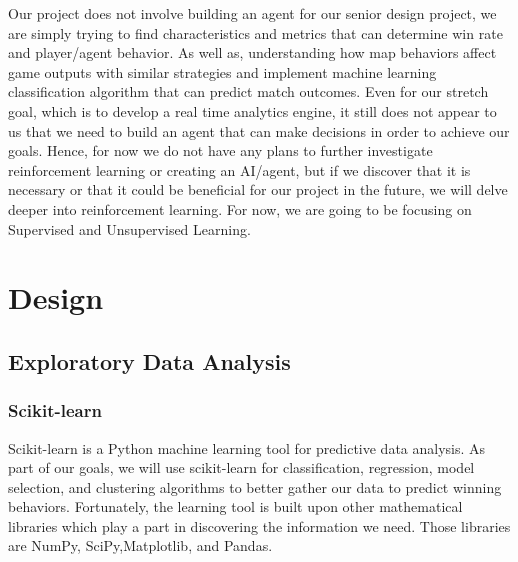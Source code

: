 \documentclass[a4paper,12pt]{report}
\begin{document}
Our project does not involve building an agent for our senior design project, we are simply trying to find characteristics and metrics that can determine win rate and player/agent behavior. As well as, understanding how map behaviors affect game outputs with similar strategies and implement machine learning classification algorithm that can predict match outcomes. Even for our stretch goal, which is to develop a real time analytics engine, it still does not appear to us that we need to build an agent that can make decisions in order to achieve our goals. Hence, for now we do not have any plans to further investigate reinforcement learning or creating an AI/agent, but if we discover that it is necessary or that it could be beneficial for our project in the future, we will delve deeper into reinforcement learning. For now, we are going to be focusing on Supervised and Unsupervised Learning.


\chapter{Design}
\section{Exploratory Data Analysis}
\subsection{Scikit-learn}

Scikit-learn is a Python machine learning tool for predictive data analysis. As part of our goals, we will use scikit-learn for classification, regression, model selection, and clustering algorithms to better gather our data to predict winning behaviors. Fortunately, the learning tool is built upon other mathematical libraries which play a part in discovering the information we need. Those libraries are NumPy, SciPy,Matplotlib, and Pandas.
\end{document}
